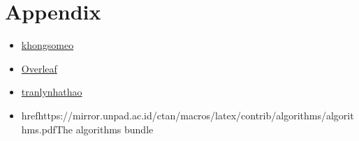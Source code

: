 \section{Appendix}
\begin{itemize}
\item \href{https://github.com/khongsomeo/hcmus-unofficial-report-template}{khongsomeo} 
\item \href{https://www.overleaf.com/latex/templates/hcmus-report-template/zyrhmsxynwqs}{Overleaf} 
\item \href{https://github.com/tranlynhathao/fit-vnuhcmus_template}{tranlynhathao}
\item href{https://mirror.unpad.ac.id/ctan/macros/latex/contrib/algorithms/algorithms.pdf}{The algorithms bundle}
\end{itemize}


